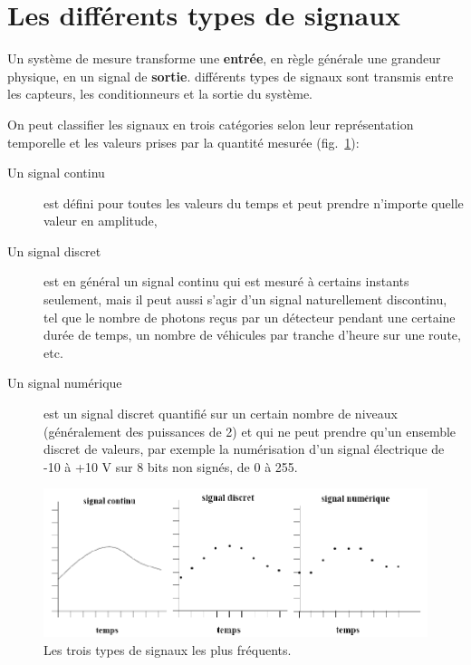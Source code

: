 \section{Les différents types de signaux}

Un système de mesure transforme une \textbf{entrée}, en règle générale une grandeur physique, en un signal de \textbf{sortie}. différents types de signaux sont transmis entre les capteurs, les conditionneurs et la sortie du système.

On peut classifier les signaux en trois catégories selon leur représentation temporelle et les valeurs prises par la quantité mesurée (fig.~\ref{fig:typsign}):
\begin{description}
\item[Un signal continu] est défini pour toutes les valeurs du temps et peut prendre n'importe quelle valeur en amplitude,
\item[Un signal discret] est en général un signal continu qui est mesuré à certains instants seulement, mais il peut aussi s'agir d'un signal naturellement discontinu, tel que le nombre de photons reçus par un détecteur pendant une certaine durée de temps, un nombre de véhicules par tranche d'heure sur une route, etc.
\item[Un signal numérique] est un signal discret quantifié sur un certain nombre de niveaux (généralement des puissances de 2) et qui ne peut prendre qu'un ensemble discret de valeurs, par exemple la numérisation d'un signal électrique de -10 à +10 V sur 8 bits non signés, de 0 à 255.
\end{description}
\begin{figure}[h]
   \centering
   \includegraphics[width=16cm]{assets/figures/typesign.pdf}
   \caption{Les trois types de signaux les plus fréquents.}\vspace{5mm}
   \label{fig:typsign}
\end{figure}

